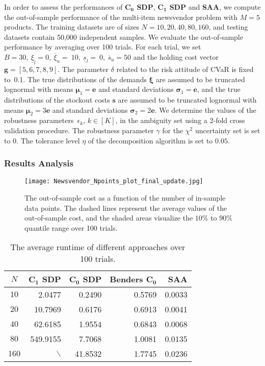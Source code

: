 \documentclass{article}
\begin{document}
In order to assess the performances of \textbf{$\mathbf{C_0}$ SDP}, \textbf{$\mathbf{C_1}$ SDP} and \textbf{SAA}, we compute the out-of-sample performance of the multi-item newsvendor problem  with $M = 5$ products. The training datasets are of sizes $N = 10, 20, 40, 80, 160$, and testing datasets contain 50,000 independent samples. We evaluate the out-of-sample performance by averaging over 100 trials. For each trial, we set $B = 30, \ \underline{\xi}_l = 0, \ \overline{\xi}_u =~10, \ \underline{s}_l =~0, \ \overline{s}_u = 50$ and the holding cost vector $\bm g = [5,6,7,8,9]$. The parameter $\delta$ related to the risk attitude of CVaR is fixed to~0.1. 
The true distributions of the demands $\bm \xi$ are assumed to be truncated lognormal with means $\bm \mu_1 = \mathbf{e}$ and standard deviations $\bm \sigma_1 = \mathbf e$, and the true distributions of the stockout costs $\bm s$ are assumed to be truncated lognormal with means $\bm \mu_2 = 3 \mathbf{e}$ and standard deviations $\bm \sigma_2 = 2 \mathbf{e}$. We determine the values of the robustness parameters~$\epsilon_k$, $k \in [K]$, in the ambiguity set using a 2-fold cross validation procedure. The robustness parameter $\gamma$ for the $\chi^2$ uncertainty set is set to $0$. The tolerance level $\eta$  of the decomposition algorithm is set to  $0.05$.

\subsubsection{Results Analysis}

\begin{figure}[t!]
		\texttt{[image: Newsvendor\_Npoints\_plot\_final\_update.jpg]}
		\caption{The out-of-sample cost  as a function of the number of in-sample data points. The dashed lines represent the average values of the out-of-sample cost, and the shaded areas visualize the $10\%$ to $90\%$ quantile range over 100 trials.}
		    \label{fig:newsvendor_performance}
\end{figure}
 	
\begin{table}[t!]
\color{black}
\centering
\begin{tabular}{|c|rrrr|}\hline
$N$  & \textbf{$\mathbf{C_1}$ SDP}  & \textbf{$\mathbf{C_0}$ SDP} &  \textbf{Benders $\mathbf{C_0}$} & \textbf{SAA} \\
[0.0mm] \hline
$10$  & 2.0477 & 0.2490 & 0.5769 & 0.0033\\
$20$  & 10.7969 & 0.6176 & 0.6913 & 0.0041\\
$40$ &  62.6185 & 1.9554 & 0.6843 & 0.0068\\ 
$80$ &  549.9155 & 7.7068 & 1.0081 & 0.0135\\
$160$ & $\backslash$ & 41.8532 & 1.7745 & 0.0236\\
\hline\hline
\end{tabular}
\caption[]{The average runtime of different approaches over 100 trials.
}
\label{tbl:newsvendor_runtime}
\end{table}
\end{document}
